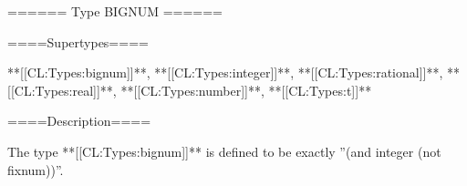 ====== Type BIGNUM ======

====Supertypes====

**[[CL:Types:bignum]]**, **[[CL:Types:integer]]**, **[[CL:Types:rational]]**, **[[CL:Types:real]]**, **[[CL:Types:number]]**, **[[CL:Types:t]]**

====Description====

The type **[[CL:Types:bignum]]** is defined to be exactly ''(and integer (not fixnum))''.

 
